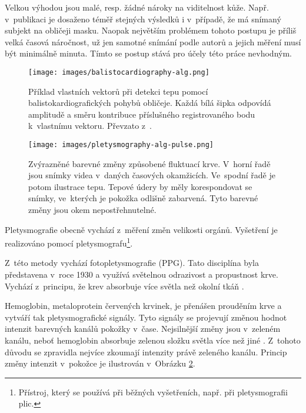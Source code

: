 \documentclass[
  digital, %
  table,   %
%
  lof,     %
  lot,     %
]{fithesis3}
\begin{document}
Velkou výhodou jsou malé, resp. žádné nároky na viditelnost kůže. Např. v~publikaci je dosaženo téměř stejných výsledků i v~případě, že má snímaný subjekt na obličeji masku. Naopak největším problémem tohoto postupu je příliš velká časová náročnost, už jen samotné snímání podle autorů a jejich měření musí být minimálně minuta. Tímto se postup stává pro účely této práce nevhodným.

\begin{figure}
  \begin{center}
    \texttt{[image: images/balistocardiography-alg.png]}
  \end{center}
  \caption{Příklad vlastních vektorů při detekci tepu pomocí balistokardiografických pohybů obličeje. Každá bílá šipka odpovídá amplitudě a směru kontribuce příslušného registrovaného bodu k~vlastnímu vektoru. Převzato z~\cite{headmotion-detection}.}
  \label{fig:balistografie-princip}
\end{figure}

\begin{figure}
  \begin{center}
    \texttt{[image: images/pletysmography-alg-pulse.png]}
  \end{center}
  \caption{Zvýrazněné barevné změny způsobené fluktuací krve. V~horní řadě jsou snímky videa v~daných časových okamžicích. Ve~spodní řadě je potom ilustrace tepu. Tepové údery by měly korespondovat se snímky, ve~kterých je pokožka odlišně zabarvená. Tyto barevné změny jsou okem nepostřehnutelné.}
  \label{fig:pletysmography-princip}
\end{figure}

Pletysmografie obecně vychází z~měření změn velikosti orgánů. Vyšetření je realizováno pomocí pletysmografu\footnote{Přístroj, který se používá při běžných vyšetřeních, např. při pletysmografii plic.}.

Z~této metody vychází fotopletysmografie (PPG). Tato disciplína byla představena v~roce 1930 a využívá světelnou odrazivost a propustnost krve. Vychází z~principu, že krev absorbuje více světla než okolní tkáň \cite{photo-plethysmographic}. 

Hemoglobin, metaloprotein červených krvinek, je přenášen prouděním krve a vytváří tak pletysmografické signály. Tyto signály se projevují změnou hodnot intenzit barevných kanálů pokožky v~čase. Nejsilnější změny jsou v~zeleném kanálu, neboť hemoglobin absorbuje zelenou složku světla více než jiné \cite{green-channel-strongest}. Z~tohoto důvodu se zpravidla nejvíce zkoumají intenzity právě zeleného kanálu. Princip změny intenzit v~pokožce je ilustrován v~Obrázku \ref{fig:pletysmography-princip}.
\end{document}
